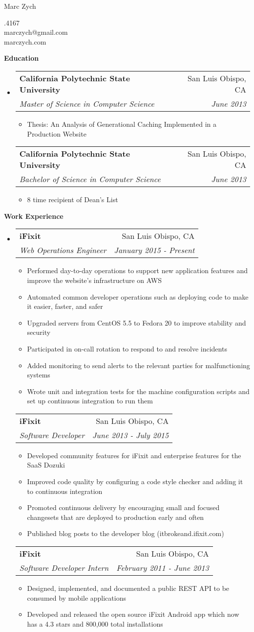 \documentclass[letterpaper,11pt]{article}
\makeatletter
\newcommand{\resauthor}[4]{
   \begin{minipage}[c]{.4\textwidth}
      \raggedright
      {\Huge #1}
   \end{minipage}
   \hfill
   \begin{minipage}[c]{.4\textwidth}
      \raggedleft
      #2\\
      #3\\
      #4
   \end{minipage}
}
\newcommand{\resitem}[1]{\item #1 \vspace{-2pt}}
\newcommand{\resheading}[1]{{\large \colorbox{mygrey}{\begin{minipage}{\textwidth}{\textbf{#1 \vphantom{p\^{E}}}}\end{minipage}}}}
\newcommand{\ressubheading}[4]{
   \begin{tabular*}{7.0in}{l@{\extracolsep{\fill}}r}
         \textbf{#1} & #2 \\
         \textit{#3} & \textit{#4} \\
   \end{tabular*}\vspace{-6pt}
}
\makeatother
\begin{document}
\resauthor{Marc Zych}{805.217.4167}{marczych@gmail.com}{marczych.com}

\resheading{Education}
\begin{itemize}
\item
   \ressubheading{California Polytechnic State University}{San Luis Obispo, CA}{Master of Science in Computer Science}{June 2013}
   \begin{itemize}
      \resitem{Thesis: An Analysis of Generational Caching Implemented in a Production Website}
   \end{itemize}
   \ressubheading{California Polytechnic State University}{San Luis Obispo, CA}{Bachelor of Science in Computer Science}{June 2013}
   \begin{itemize}
      \resitem{8 time recipient of Dean's List}
   \end{itemize}
\end{itemize}

\resheading{Work Experience}
\begin{itemize}
\item
   \ressubheading{iFixit}{San Luis Obispo, CA}{Web Operations Engineer}{January 2015 - Present}
   \begin{itemize}
      \resitem{Performed day-to-day operations to support new application features and improve the website's infrastructure on AWS}
      \resitem{Automated common developer operations such as deploying code to make it easier, faster, and safer}
      \resitem{Upgraded servers from CentOS 5.5 to Fedora 20 to improve stability and security}
      \resitem{Participated in on-call rotation to respond to and resolve incidents}
      \resitem{Added monitoring to send alerts to the relevant parties for malfunctioning systems}
      \resitem{Wrote unit and integration tests for the machine configuration scripts and set up continuous integration to run them}
   \end{itemize}
   \ressubheading{iFixit}{San Luis Obispo, CA}{Software Developer}{June 2013 - July 2015}
   \begin{itemize}
      \resitem{Developed community features for iFixit and enterprise features for the SaaS Dozuki}
      \resitem{Improved code quality by configuring a code style checker and adding it to continuous integration}
      \resitem{Promoted continuous delivery by encouraging small and focused changesets that are deployed to production early and often}
      \resitem{Published blog posts to the developer blog (itbrokeand.ifixit.com)}
   \end{itemize}
   \ressubheading{iFixit}{San Luis Obispo, CA}{Software Developer Intern}{February 2011 - June 2013}
   \begin{itemize}
      \resitem{Designed, implemented, and documented a public REST API to be consumed by mobile applications}
      \resitem{Developed and released the open source iFixit Android app which now has a 4.3 stars and 800,000 total installations}
   \end{itemize}
\end{itemize}
\end{document}
